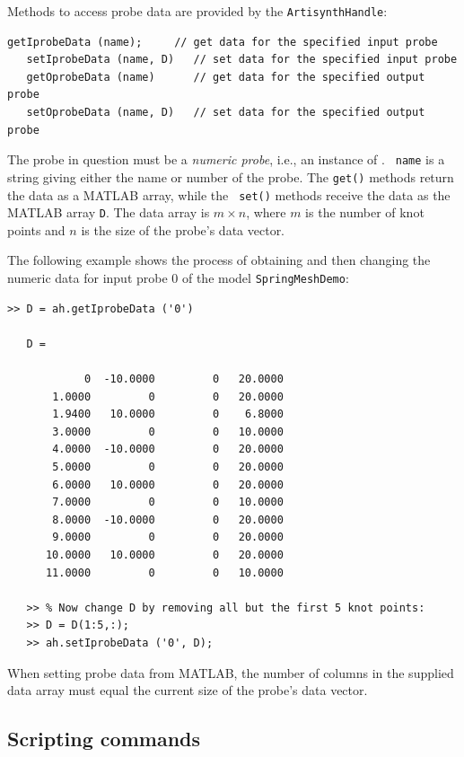 \documentclass{article}
\begin{document}
Methods to access probe data are provided by the {\tt ArtisynthHandle}:
%
\begin{lstlisting}[]
   getIprobeData (name);     // get data for the specified input probe
   setIprobeData (name, D)   // set data for the specified input probe
   getOprobeData (name)      // get data for the specified output probe
   setOprobeData (name, D)   // set data for the specified output probe
\end{lstlisting}
%
The probe in question must be a {\it numeric probe}, i.e., an instance of 
. {\tt
name} is a string giving either the name or number of the probe. The
{\tt get()} methods return the data as a MATLAB array, while the {\tt
set()} methods receive the data as the MATLAB array {\tt D}.  The
data array is $m \times n$, where $m$ is the number of knot points
and $n$ is the size of the probe's data vector.

The following example shows the process of obtaining and then changing
the numeric data for input probe 0 of the model {\tt SpringMeshDemo}:
%
\begin{lstlisting}[]
   >> D = ah.getIprobeData ('0')
   
   D =
   
            0  -10.0000         0   20.0000
       1.0000         0         0   20.0000
       1.9400   10.0000         0    6.8000
       3.0000         0         0   10.0000
       4.0000  -10.0000         0   20.0000
       5.0000         0         0   20.0000
       6.0000   10.0000         0   20.0000
       7.0000         0         0   10.0000
       8.0000  -10.0000         0   20.0000
       9.0000         0         0   20.0000
      10.0000   10.0000         0   20.0000
      11.0000         0         0   10.0000
   
   >> % Now change D by removing all but the first 5 knot points:
   >> D = D(1:5,:);
   >> ah.setIprobeData ('0', D);
\end{lstlisting}
%

\begin{sideblock}
When setting probe data from MATLAB, the number of columns in the
supplied data array must equal the current size of the probe's data
vector.
\end{sideblock}

\subsection{Scripting commands}
\label{MatlabScripting:sec}
\end{document}
